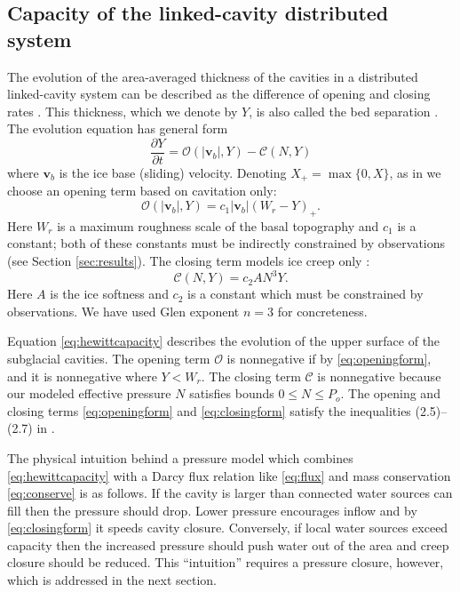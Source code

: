 \documentclass[11pt,final]{amsart}
\newcommand\bv{\mathbf{v}}
\begin{document}
\subsection*{Capacity of the linked-cavity distributed system}  The evolution of the area-averaged thickness of the cavities in a distributed linked-cavity system can be described as the difference of opening and closing rates \citep{Hewitt2011}.  This thickness, which we denote by $Y$, is also called the bed separation \citep{Bartholomausetal2011}.  The evolution equation has general form
\begin{equation}
\frac{\partial Y}{\partial t} = \mathcal{O}(|\bv_b|,Y) - \mathcal{C}(N,Y) \label{eq:hewittcapacity}
\end{equation}
where $\bv_b$ is the ice base (sliding) velocity.  Denoting $X_+= \max\{0,X\}$, as in \cite{Schoofetal2012} we choose an opening term based on cavitation only:
\begin{equation}
 \mathcal{O}(|\bv_b|,Y) = c_1 |\bv_b| (W_r - Y)_+. \label{eq:openingform}
\end{equation}
Here $W_r$ is a maximum roughness scale of the basal topography and $c_1$ is a constant; both of these constants must be indirectly constrained by observations (see Section \ref{sec:results}).  The closing term models ice creep only \citep{Hewitt2011,Schoofetal2012}:
\begin{equation}
\mathcal{C}(N,Y) = c_2 A N^3 Y. \label{eq:closingform}
\end{equation}
Here $A$ is the ice softness and $c_2$ is a constant which must be constrained by observations.  We have used Glen exponent $n=3$ for concreteness.

Equation \eqref{eq:hewittcapacity} describes the evolution of the upper surface of the subglacial cavities.  The opening term $\mathcal{O}$ is nonnegative if by \eqref{eq:openingform}, and it is nonnegative where $Y<W_r$.  The closing term $\mathcal{C}$ is nonnegative because our modeled effective pressure $N$ satisfies bounds $0\le N \le P_o$.  The opening and closing terms \eqref{eq:openingform} and \eqref{eq:closingform} satisfy the inequalities (2.5)--(2.7) in \cite{Schoofetal2012}.

The physical intuition behind a pressure model which combines \eqref{eq:hewittcapacity} with a Darcy flux relation like \eqref{eq:flux} and mass conservation \eqref{eq:conserve} is as follows.  If the cavity is larger than connected water sources can fill then the pressure should drop.  Lower pressure encourages inflow and by \eqref{eq:closingform} it speeds cavity closure.  Conversely, if local water sources exceed capacity then the increased pressure should push water out of the area and creep closure should be reduced.  This ``intuition'' requires a pressure closure, however, which is addressed in the next section.
\end{document}
